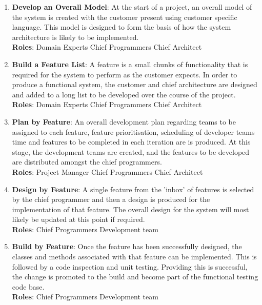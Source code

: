 \documentclass{article}
\begin{document}
\begin{enumerate}
	\item \textbf{Develop an Overall Model}: At the start of a project, an overall model of the system is created with the customer present using customer specific language. This model is designed to form the basis of how the system architecture is likely to be implemented. 
	\\
	\textbf{Roles}: Domain Experts \textbullet{} Chief Programmers \textbullet{} Chief Architect
	
	\item \textbf{Build a Feature List}: A feature is a small chunks of functionality that is required for the system to perform as the customer expects. In order to produce a functional system, the customer and chief architecture are designed and added to a long list to be developed over the course of the project. 
	\\
	\textbf{Roles}: Domain Experts \textbullet{} Chief Programmers \textbullet{} Chief Architect
	
	\item \textbf{Plan by Feature}: An overall development plan regarding teams to be assigned to each feature, feature prioritisation, scheduling of developer teams time and features to be completed in each iteration are is produced. At this stage, the development teams are created, and the features to be developed are distributed amongst the chief programmers. 
	\\
	\textbf{Roles}: Project Manager \textbullet{} Chief Programmers \textbullet{} Chief Architect
	
	\item \textbf{Design by Feature}: A single feature from the 'inbox' of features is selected by the chief programmer and then a design is produced for the implementation of that feature. The overall design for the system will most likely be updated at this point if required.
	\\
	\textbf{Roles}: Chief Programmers \textbullet{} Development team
	
	
	\item \textbf{Build by Feature}: Once the feature has been successfully designed, the classes and methods associated with that feature can be implemented. This is followed by a code inspection and unit testing. Providing this is successful, the change is promoted to the build and become part of the functional testing code base.
	\\
	\textbf{Roles}: Chief Programmers \textbullet{} Development team

\end{enumerate}
\end{document}
